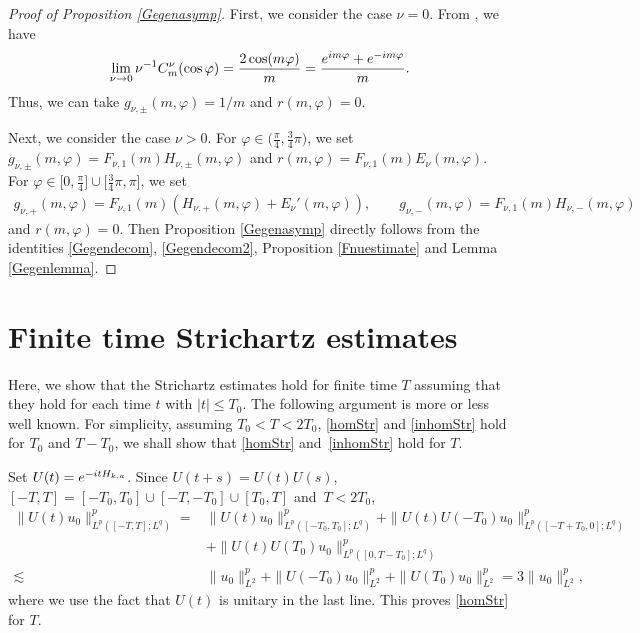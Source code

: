 \documentclass[10pt,a4paper]{article}
\numberwithin{equation}{section}
\def\f{\varphi}
\def\n{\nu}
\begin{document}
\begin{proof}[Proof of Proposition \ref{Gegenasymp}]
First, we consider the case $\n=0$. From \cite[equation~(4.28)]{BKO}, we have
\begin{align*}
\lim_{\n\to 0}\n^{-1}C_m^{\n}(\cos\f)=\frac{2\cos (m\f)}{m}=\frac{{\rm e}^{{\rm i}m\f}+{\rm e}^{-{\rm i}m\f}}{m}.
\end{align*}
Thus, we can take $g_{\n,\pm}(m,\f)=1/m$ and $r(m,\f)=0$.

Next, we consider the case $\n>0$. For $\f\in \bigl(\frac{\pi}{4}, \frac{3}{4}\pi\bigr)$, we set $g_{\n,\pm}(m,\f)=F_{\n,1}(m)H_{\n,\pm}(m,\f)$ and $r(m,\f)=F_{\n,1}(m)E_{\n}(m,\f)$. For $\f\in \bigl[0,\frac{\pi}{4}\bigr]\cup \bigl[\frac{3}{4}\pi,\pi\bigr]$, we set
\begin{align*}
g_{\n,+}(m,\f)=F_{\n,1}(m)(H_{\n,+}(m,\f)+E_{\n}'(m,\f)),\qquad g_{\n,-}(m,\f)=F_{\n,1}(m)H_{\n,-}(m,\f)
\end{align*}
and $r(m,\f)=0$. Then Proposition \ref{Gegenasymp} directly follows from the identities \eqref{Gegendecom}, \eqref{Gegendecom2}, Proposition \ref{Fnuestimate} and Lemma \ref{Gegenlemma}.
\end{proof}

\section{Finite time Strichartz estimates}\label{finitetime}

Here, we show that the Strichartz estimates hold for finite time $T$ assuming that they hold for each time $t$ with $|t|\leq T_0$.
The following argument is more or less well known.
For simplicity, assuming $T_0<T<2T_0$, \eqref{homStr} and \eqref{inhomStr} hold for $T_0$ and $T-T_0$, we shall show that \eqref{homStr} and~\eqref{inhomStr} hold for $T$.

Set $U(t)={\rm e}^{-{\rm i}tH_{k,a}}$.
Since $U(t+s)=U(t)U(s)$, $[-T,T]=[-T_0,T_0]\cup [-T,-T_0]\cup [T_0,T]$ and~${T<2T_0}$,
\begin{align*}
\|U(t)u_0\|_{L^p([-T,T];L^q)}^p={}&\|U(t)u_0\|_{L^p([-T_0,T_0];L^q)}^p+\|U(t)U(-T_0)u_0\|_{L^p([-T+T_0,0];L^q)}^p\\
&+\|U(t)U(T_0)u_0\|_{L^p([0,T-T_0];L^q)}^p\\
\lesssim{}&\|u_0\|_{L^2}^p+\|U(-T_0)u_0\|_{L^2}^p+\|U(T_0)u_0\|_{L^2}^p=3\|u_0\|_{L^2}^p,
\end{align*}
where we use the fact that $U(t)$ is unitary in the last line. This proves \eqref{homStr} for $T$.
\end{document}
